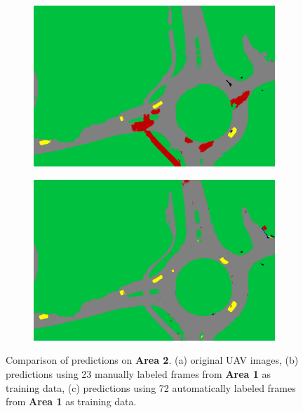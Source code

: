 \begin{figure}[htb]
\begin{subfigure}{0.32\columnwidth}
  \caption{}
\end{subfigure}
\begin{subfigure}{0.32\columnwidth}
  \centering
  \includegraphics[width=1\linewidth]{fig/segmentation/DSC01001_manual.png}
 
  \caption{}
\end{subfigure}
\begin{subfigure}{0.32\columnwidth}
  \centering
  \includegraphics[width=1\linewidth]{fig/segmentation/DSC01001_auto.png}
  
  \caption{}
\end{subfigure}
\caption{Comparison of predictions on \textbf{Area 2}. (a) original UAV images, (b) predictions using 23 manually labeled frames from \textbf{Area 1} as training data, (c) predictions using 72 automatically labeled frames from \textbf{Area 1} as training data.}
\label{fig:area2}
\end{figure}

